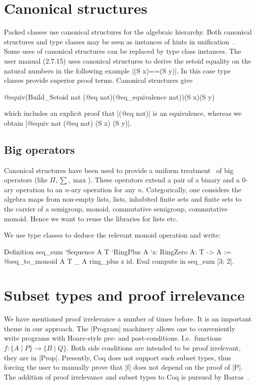 \documentclass[a4paper,10pt,runningheads]{llncs}
\begin{document}
\section{Canonical structures}\label{canonical}
Packed classes use canonical structures for the algebraic hierarchy. Both canonical structures and
type classes may be seen as instances of hints in unification~\cite{Hints}. Some uses of canonical
structures can be replaced by type class instances. The user manual (2.7.15) uses canonical
structures to derive the setoid equality on the natural
numbers in the following example |(S x)==(S y)|. In this case type classes provide superior proof
terms. Canonical structures give
\begin{code}
@equiv(Build_Setoid nat (@eq nat)(@eq_equivalence nat))(S x)(S y)
\end{code}
which includes an explicit proof that |(@eq nat)| is an equivalence,
whereas we obtain |@equiv nat (@eq nat) (S x) (S y)|.

\subsection{Big operators}
Canonical structures have been used to provide a uniform treatment~\cite{bertot2008canonical} of big
operators (like $\Pi,\sum, \max$). These operators extend a pair of a binary and a 0-ary operation
to an $n$-ary operation for any $n$. Categorically, one considers the algebra maps from non-empty
lists, lists, inhabited finite sets and finite sets to the carrier of a semigroup, monoid,
commutative semigroup, commutative monoid. Hence we want to reuse the libraries for lists etc.

We use type classes to deduce the relevant monoid operation and write:
\begin{code}
Definition seq_sum
  `{Sequence A T} `{RingPlus A} `{z: RingZero A}: T -> A
  := @seq_to_monoid A T _ A ring_plus z id.
  Eval compute in seq_sum [3; 2].
\end{code}

\section{Subset types and proof irrelevance}\label{PI}
We have mentioned proof irrelevance a number of times before. It is an important theme in our
approach. The |Program| machinery allows one to conveniently write programs with Hoare-style
pre- and post-conditions. I.e.\ functions $f: \{ A \mid P \} \to \{ B \mid Q \}$. Both side
conditions
are intended to be proof irrelevant, they are in |Prop|. Presently, Coq does not support such subset
types, thus forcing the user to manually prove that |f| does not depend on the proof of |P|.
The addition of proof irrelevance and subset types to Coq is pursued by
Barras~\cite{Barras:subset,Werner}. 
\end{document}
